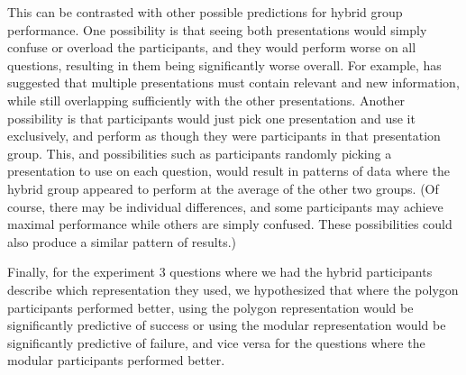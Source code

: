 \documentclass[man,10pt]{apa6}
\begin{document}
This can be contrasted with other possible predictions for hybrid group performance. One possibility is that seeing both presentations would simply confuse or overload the participants, and they would perform worse on all questions, resulting in them being significantly worse overall. For example,  has suggested that multiple presentations must contain relevant and new information, while still overlapping sufficiently with the other presentations. Another possibility is that participants would just pick one presentation and use it exclusively, and perform as though they were participants in that presentation group. This, and possibilities such as participants randomly picking a presentation to use on each question, would result in patterns of data where the hybrid group appeared to perform at the average of the other two groups. (Of course, there may be individual differences, and some participants may achieve maximal performance while others are simply confused. These possibilities could also produce a similar pattern of results.) \par
Finally, for the experiment 3 questions where we had the hybrid participants describe which representation they used, we hypothesized that where the polygon participants performed better, using the polygon representation would be significantly predictive of success or using the modular representation would be significantly predictive of failure, and vice versa for the questions where the modular participants performed better.
\end{document}
